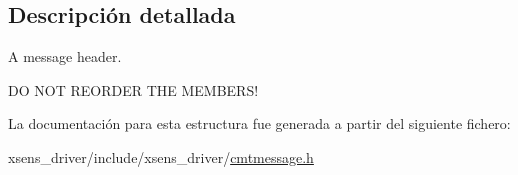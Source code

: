 \subsection{\-Descripción detallada}
\-A message header. 

\-D\-O \-N\-O\-T \-R\-E\-O\-R\-D\-E\-R \-T\-H\-E \-M\-E\-M\-B\-E\-R\-S! 

\-La documentación para esta estructura fue generada a partir del siguiente fichero\-:\begin{DoxyCompactItemize}
\item 
xsens\-\_\-driver/include/xsens\-\_\-driver/\hyperlink{cmtmessage_8h}{cmtmessage.\-h}\end{DoxyCompactItemize}

